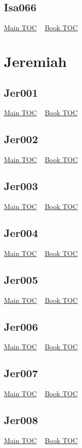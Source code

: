 \documentclass{book}
\begin{document}
  \section{Isa066}\hyperlink{toc}{Main TOC} ~ \hyperref[subsec:Isa]{Book TOC} 
  \chapter{Jeremiah} \label{subsec:Jer} \begin{multicols}{2} \minitoc \end{multicols}
  \section{Jer001}\hyperlink{toc}{Main TOC} ~ \hyperref[subsec:Jer]{Book TOC} 
  \section{Jer002}\hyperlink{toc}{Main TOC} ~ \hyperref[subsec:Jer]{Book TOC} 
  \section{Jer003}\hyperlink{toc}{Main TOC} ~ \hyperref[subsec:Jer]{Book TOC} 
  \section{Jer004}\hyperlink{toc}{Main TOC} ~ \hyperref[subsec:Jer]{Book TOC} 
  \section{Jer005}\hyperlink{toc}{Main TOC} ~ \hyperref[subsec:Jer]{Book TOC} 
  \section{Jer006}\hyperlink{toc}{Main TOC} ~ \hyperref[subsec:Jer]{Book TOC} 
  \section{Jer007}\hyperlink{toc}{Main TOC} ~ \hyperref[subsec:Jer]{Book TOC} 
  \section{Jer008}\hyperlink{toc}{Main TOC} ~ \hyperref[subsec:Jer]{Book TOC} 
\end{document}
